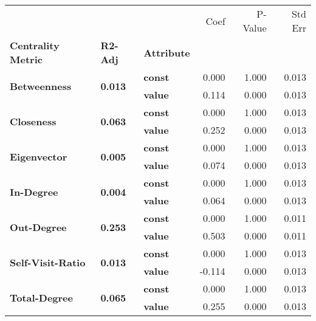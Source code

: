 \begin{tabular}{lllrrr}
\toprule
             &       &       &   Coef &  P-Value &  Std Err \\
\textbf{Centrality Metric} & \textbf{R2-Adj} & \textbf{Attribute} &        &          &          \\
\midrule
\multirow{2}{*}{\textbf{Betweenness}} & \multirow{2}{*}{\textbf{0.013}} & \textbf{const} &  0.000 &    1.000 &    0.013 \\
             &       & \textbf{value} &  0.114 &    0.000 &    0.013 \\
\cline{1-6}
\cline{2-6}
\multirow{2}{*}{\textbf{Closeness}} & \multirow{2}{*}{\textbf{0.063}} & \textbf{const} &  0.000 &    1.000 &    0.013 \\
             &       & \textbf{value} &  0.252 &    0.000 &    0.013 \\
\cline{1-6}
\cline{2-6}
\multirow{2}{*}{\textbf{Eigenvector}} & \multirow{2}{*}{\textbf{0.005}} & \textbf{const} &  0.000 &    1.000 &    0.013 \\
             &       & \textbf{value} &  0.074 &    0.000 &    0.013 \\
\cline{1-6}
\cline{2-6}
\multirow{2}{*}{\textbf{In-Degree}} & \multirow{2}{*}{\textbf{0.004}} & \textbf{const} &  0.000 &    1.000 &    0.013 \\
             &       & \textbf{value} &  0.064 &    0.000 &    0.013 \\
\cline{1-6}
\cline{2-6}
\multirow{2}{*}{\textbf{Out-Degree}} & \multirow{2}{*}{\textbf{0.253}} & \textbf{const} &  0.000 &    1.000 &    0.011 \\
             &       & \textbf{value} &  0.503 &    0.000 &    0.011 \\
\cline{1-6}
\cline{2-6}
\multirow{2}{*}{\textbf{Self-Visit-Ratio}} & \multirow{2}{*}{\textbf{0.013}} & \textbf{const} &  0.000 &    1.000 &    0.013 \\
             &       & \textbf{value} & -0.114 &    0.000 &    0.013 \\
\cline{1-6}
\cline{2-6}
\multirow{2}{*}{\textbf{Total-Degree}} & \multirow{2}{*}{\textbf{0.065}} & \textbf{const} &  0.000 &    1.000 &    0.013 \\
             &       & \textbf{value} &  0.255 &    0.000 &    0.013 \\
\bottomrule
\end{tabular}
